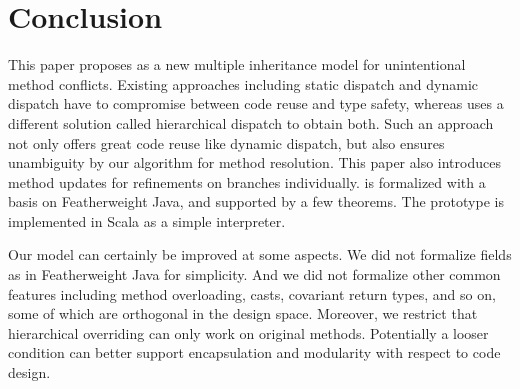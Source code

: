 \section{Conclusion}

This paper proposes \MIM{} as a new multiple inheritance model for unintentional method conflicts.
Existing approaches including static dispatch and dynamic dispatch have to compromise between code reuse
and type safety, whereas \MIM{} uses a different solution called hierarchical dispatch to obtain both.
Such an approach not only offers great code reuse like dynamic dispatch, but also ensures unambiguity by
our algorithm for method resolution. This paper also introduces method updates for refinements on branches individually.
\MIM{} is formalized with a basis on Featherweight Java, and supported
by a few theorems. The prototype is implemented in Scala as a simple interpreter.

Our model can certainly be improved at some aspects. We did not formalize fields as in Featherweight Java for simplicity.
And we did not formalize other common features including
method overloading, casts, covariant return types, and so on, some of which are orthogonal in the design space. Moreover, we restrict that hierarchical overriding can only work on original methods. Potentially a looser condition can better support encapsulation and modularity with respect to code design.